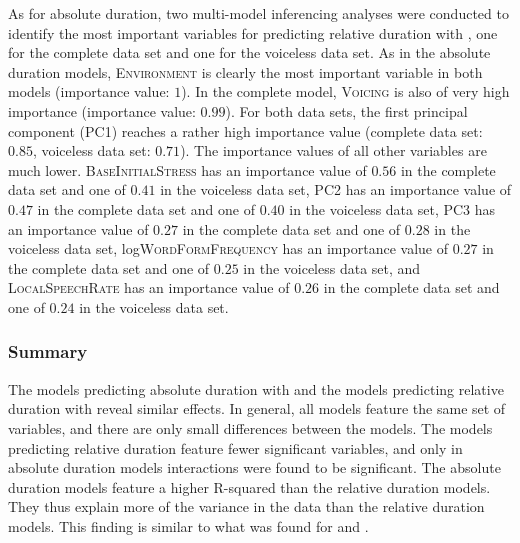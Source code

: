 As for absolute duration, two multi-model inferencing analyses were conducted to identify the most important variables for predicting relative duration with , one for the complete data set and one for the voiceless data set. 
 As in the absolute duration models, \textsc{Environment} is clearly the most important variable in both models (importance value: $1$). In the complete model, \textsc{Voicing} is also of very high importance  (importance value: $0.99$). For both data sets, the first principal component (\textsc{PC1}) reaches a rather high importance value (complete data set: $0.85$,  voiceless data set: $0.71$). The importance values of all other variables are much lower.
\textsc{BaseInitialStress} has an importance value of $0.56$ in the complete data set and one of $0.41$ in the voiceless data set,   
\textsc{PC2} has an importance value of $0.47$ in the complete data set and one of $0.40$ in the voiceless data set,   
\textsc{PC3} has an importance value of $0.27$ in the complete data set and one of $0.28$ in the voiceless data set,   
log\textsc{WordFormFrequency} has an importance value of $0.27$ in the complete data set and one of $0.25$ in the voiceless data set, and  
\textsc{LocalSpeechRate} has an importance value of $0.26$ in the complete data set and one of $0.24$ in the voiceless data set.  

\subsubsection{Summary}


The models predicting absolute duration with  and the models predicting relative duration with  reveal similar effects. In general, all models feature the same set of variables, and there are only small differences between the models. The models predicting relative duration feature fewer significant variables, and only in absolute duration models interactions were found to be significant. 
The absolute duration models feature a higher R-squared than the relative duration models. They thus explain more of the variance in the data than the relative duration models. This finding is similar to what was found for  and . 

